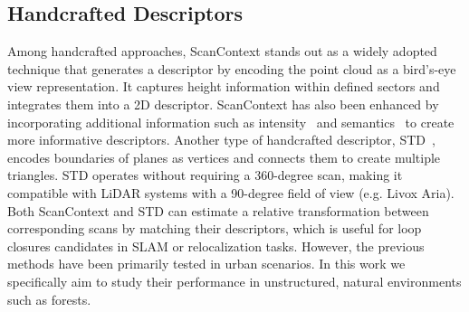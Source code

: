 \subsection*{Handcrafted Descriptors} 
Among handcrafted approaches, ScanContext\cite{kim2018iros,kim2021tro} stands out as a widely adopted technique that generates a descriptor by encoding the point cloud as a bird’s-eye view representation. It captures height information within defined sectors and integrates them into a 2D descriptor. 
ScanContext has also been enhanced by incorporating additional information such as intensity~\cite{wang2020icra} and semantics~\cite{li2021iros} to create more informative descriptors. 
Another type of handcrafted descriptor, STD~\cite{yuan2023icra}, encodes boundaries of planes as vertices and connects them to create multiple triangles. STD operates without requiring a 360-degree scan, making it compatible with LiDAR systems with a 90-degree field of view (e.g. Livox Aria). Both ScanContext and STD can estimate a relative transformation between corresponding scans by matching their descriptors, which is useful for loop closures candidates in SLAM or relocalization tasks. However, the previous methods have been primarily tested in urban scenarios. In this work we specifically aim to study their performance in unstructured, natural environments such as forests.

